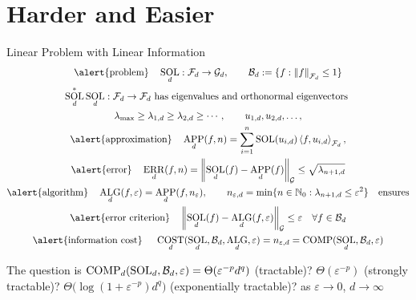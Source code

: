 \documentclass[11pt,compress,xcolor={usenames,dvipsnames},aspectratio=169]{beamer}
\DeclareMathOperator{\COMP}{COMP}
\DeclareMathOperator{\COST}{COST}
\DeclareMathOperator{\ALG}{ALG}
\DeclareMathOperator{\SOL}{SOL}
\DeclareMathOperator{\APP}{APP}
\DeclareMathOperator{\ERR}{ERR}
\begin{document}
\section{Harder and Easier}
\begin{frame}{Linear Problem with Linear Information}
    \vspace{-7ex}
   \begin{gather*}
   \text{\alert{problem}}\quad \SOL_d : \cf_d \to \cg_d,  \qquad \cb_d : = \{f : \norm[\cf_d]{f} \le 1 \} \\
   \SOL_d^*\SOL_d : \cf_d \to \cf_d \text{ has eigenvalues and orthonormal eigenvectors } \\
\lambda_{\max} \ge \lambda_{1,d} \ge \lambda_{2,d} \ge \cdots, \qquad u_{1,d}, u_{2,d}, \ldots, \\
   \text{\alert{approximation}\quad} \APP_d(f,n) = \sum_{i=1}^n \SOL(u_{i,d}) \ip[\cf_d]{f}{u_{i,d}}, \\
   \text{\alert{error}\quad}\ERR_d(f,n) = \norm[\cg]{\SOL_d(f) - \APP_d(f)} \le \sqrt{\lambda_{n+1, d}} \\
   \text{\alert{algorithm}\quad} \ALG_d(f,\varepsilon) = \APP_d(f,n_\varepsilon), \qquad n_{\varepsilon,d} = \min \{n \in \natzero : \lambda_{n+1, d} \le \varepsilon^2\} \quad \text{ensures}\\
   \text{\alert{error criterion}\quad} \norm[\cg]{\SOL_d(f) - \ALG_d(f,\varepsilon)} \le \varepsilon \quad \forall f \in \cb_d \\
   \text{\alert{information cost} \quad} \COST_d(\SOL_d,\cb_d,\ALG_d,\varepsilon) = n_{\varepsilon,d} = \COMP(\SOL_d,\cb_d,\varepsilon)
   \end{gather*}
   
   \vspace{-3ex}
   The question is $\COMP_d(\SOL_d,\cb_d,\varepsilon) = \Theta(\varepsilon^{-p} d^q)$ (tractable)? $\Theta(\varepsilon^{-p})$ (strongly tractable)? $\Theta\bigl(\log(1 + \varepsilon^{-p} ) d^q \bigr)$ (exponentially  tractable)?
   \hfill \hfill as $\varepsilon \to 0$, $d \to \infty$
   

\end{frame}
\end{document}
